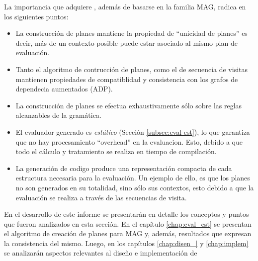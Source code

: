 La importancia que adquiere \maggen, además de basarse en la familia MAG, radica en los siguientes puntos: 
\begin{itemize}
\item La construcción de planes mantiene la propiedad de ``unicidad de planes'' es decir, más de un contexto posible puede estar asociado al mismo plan de evaluación.

\item Tanto el algoritmo de contrucción de planes, como el de secuencia de visitas mantienen propiedades de compatiblidad y consistencia con los grafos de dependecia aumentados (ADP).

\item La construcción de planes se efectua exhaustivamente sólo sobre las reglas alcanzables de la gramática.

 
 \item El evaluador generado es \textit{estático} (Sección \ref{subsec:eval-est}), lo que garantiza que no hay procesamiento ``overhead'' en la evaluacion. Esto, debido a que todo el cálculo y tratamiento se realiza en tiempo de compilación.
 
 \item La generación de codigo produce una representación compacta de cada estructura necesaria para la evaluación. Un ejemplo de ello, es que los planes no son generados en su totalidad, sino sólo sus contextos, esto debido a que la evaluación se realiza a través de las secuencias de visita.
 
\end{itemize}

En el desarrollo de este informe se presentarán en detalle los conceptos y puntos que fueron analizados en esta sección. En el capítulo \ref{chap:eval_est} se presentan el algoritmo de creación de planes para MAG y, además, resultados que expresan la consistencia del mismo. Luego, en los capítulos \ref{chap:disen_} y \ref{chap:implem} se analizarán aspectos relevantes al diseño e implementación de \maggen 



